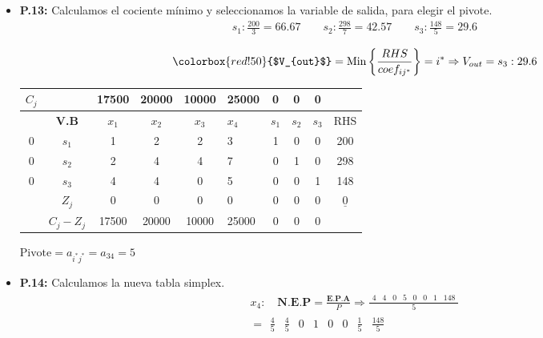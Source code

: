 \documentclass{templateNote}
\begin{document}
\begin{itemize}
    \item \textbf{P.13:} Calculamos el cociente mínimo y seleccionamos la variable de salida, para elegir el pivote.
    \begin{align*}
        s_1: \frac{200}{3} = 66.67 \qquad s_2: \frac{298}{7} = 42.57 \qquad s_3: \frac{148}{5} = 29.6 \\
    \end{align*}
    \begin{equation*}
        \colorbox{red!50}{$V_{out}$} = \text{Min} \left\{ \frac{RHS}{coef_{ij^*}} \right\} = i^* \Rightarrow V_{out} = s_3 : 29.6
    \end{equation*}
    \begin{center}
        \begin{tabular}{|c|c|c|c|c|g|c|c|c|c|}
            \hline
            $C_j$ & & 17500 & 20000 & 10000 & 25000 & 0 & 0 & 0 & \\ \hline
            & \textbf{V.B} & $x_1$ & $x_2$ & $x_3$ & $x_4$ & $s_1$ & $s_2$ & $s_3$ & RHS \\  & $s_1$ & 1 & 2 & 2 & 3 & 1 & 0 & 0 & 200 \\
            0 & $s_2$ & 2 & 4 & 4 & 7 & 0 & 1 & 0 & 298 \\
            0 & $s_3$ & 4 & 4 & 0 & 5 & 0 & 0 & 1 & 148 \\ \hline
            & $Z_j$ & 0 & 0 & 0 & 0 & 0 & 0 & 0 & $\underline{0}$ \\ \hline
            & $C_j - Z_j$ & 17500 & 20000 & 10000 & 25000 & 0 & 0 & 0 & \\ \hline
        \end{tabular}
    \end{center}
    \begin{center}
        $\text{Pivote} = a_{i^*j^*} = a_{34} = 5$
    \end{center}

    \item \textbf{P.14:} Calculamos la nueva tabla simplex.
    \begin{align*}
        x_4: \quad \textbf{N.E.P} = \frac{\textbf{E.P.A}}{P} \Rightarrow \frac{\begin{array}{cccccccc} 4 & 4 & 0 & 5 & 0 & 0 & 1 & 148\end{array}}{5} \\
        = \begin{array}{cccccccc} \frac{4}{5} & \frac{4}{5} & 0 & 1 & 0 & 0 & \frac{1}{5} & \frac{148}{5}\end{array}
    \end{align*}


\end{itemize}
\end{document}
